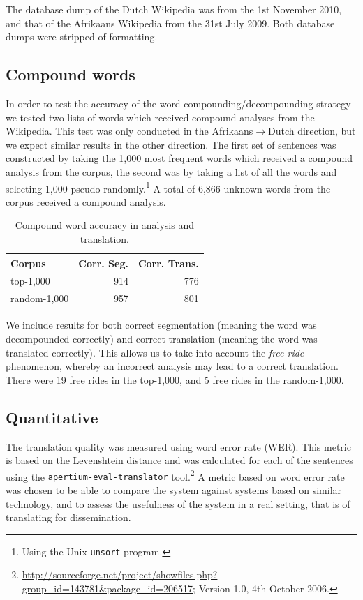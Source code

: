 \documentclass[11pt]{article}
\begin{document}
The database dump of the Dutch Wikipedia was from the 1st November 2010, and that
of the Afrikaans Wikipedia from the 31st July 2009. Both database dumps were 
stripped of formatting.

\subsection{Compound words}

In order to test the accuracy of the word compounding/decompounding strategy
we tested two lists of words which received compound analyses from 
the Wikipedia. This test was only conducted in the Afrikaans$\rightarrow$Dutch
direction, but we expect similar results in the other direction. The first
set of sentences was constructed by taking the 1,000 most frequent words which received 
a compound analysis from the corpus, the second was by taking a list of all the words and selecting
1,000 pseudo-randomly.\footnote{Using the Unix {\small {\tt unsort}} program.} A total of
6,866 unknown words from the corpus received a compound analysis.

\begin{table}
  \begin{center}
  \begin{tabular}{|l|r|r|}
   \hline
   {\bf Corpus}    & {\bf Corr. Seg.}    & {\bf Corr. Trans.}\\
   \hline
   top-1,000       & 914                 &  776 \\ 
   \hline
   random-1,000    & 957                 &  801 \\ 
   \hline
  \end{tabular}
    \caption{Compound word accuracy in analysis and translation.}
    \label{table:compounds}
  \end{center}
\end{table}

We include results for both correct segmentation (meaning the word was decompounded 
correctly) and correct translation (meaning the word was translated correctly). This allows
us to take into account the {\em free ride} phenomenon, whereby an incorrect analysis
may lead to a correct translation. There were 19 free rides in the top-1,000, and 5 free 
rides in the random-1,000.

\subsection{Quantitative}

The translation quality was measured using word error rate (WER).
This metric is based on the Levenshtein distance \cite{Levenshtein:65} and was calculated for each of the sentences using the 
{\small \texttt{apertium-eval-translator}} tool.\footnote{\url{http://sourceforge.net/project/showfiles.php?group_id=143781&package_id=206517}; Version 1.0, 4th October 2006.} A metric based on word error rate was chosen to be able to compare 
the system against systems based on similar technology, and to assess the usefulness of the 
system in a real setting, that is of translating for dissemination. 
\end{document}
